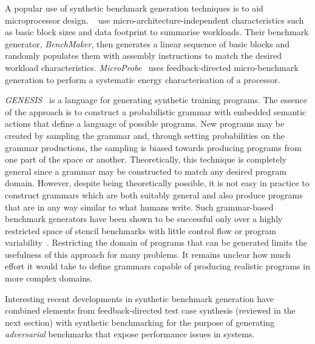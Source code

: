 A popular use of synthetic benchmark generation techniques is to aid microprocessor design. \citeauthor{Joshi2008}~\cite{Joshi2008} use micro-architecture-independent characteristics such as basic block sizes and data footprint to summarise workloads. Their benchmark generator, \emph{BenchMaker}, then generates a linear sequence of basic blocks and randomly populates them with assembly instructions to match the desired workload characteristics.
\emph{MicroProbe}~\cite{Bertran2012} uses feedback-directed micro-benchmark generation to perform a systematic energy characterisation of a processor.

\emph{GENESIS}~\cite{Chiu2015} is a language for generating synthetic training programs. The essence of the approach is to construct a probabilistic grammar with embedded semantic actions that define a language of possible programs. New programs may be created by sampling the grammar and, through setting probabilities on the grammar productions, the sampling is biased towards producing programs from one part of the space or another. Theoretically, this technique is completely general since a grammar may be constructed to match any desired program domain. However, despite being theoretically possible, it is not easy in practice to construct grammars which are both suitably general and also produce programs that are in any way similar to what humans write. Such grammar-based benchmark generators have been shown to be successful only over a highly restricted space of stencil benchmarks with little control flow or program variability~\cite{Garvey2015b,Falch2015,Cummins2016a}. Restricting the domain of programs that can be generated limits the usefulness of this approach for many problems. It remains unclear how much effort it would take to define grammars capable of producing realistic programs in more complex domains.

Interesting recent developments in synthetic benchmark generation have combined elements from feedback-directed test case synthesis (reviewed in the next section) with synthetic benchmarking for the purpose of generating \emph{adversarial} benchmarks that expose performance issues in systems.

